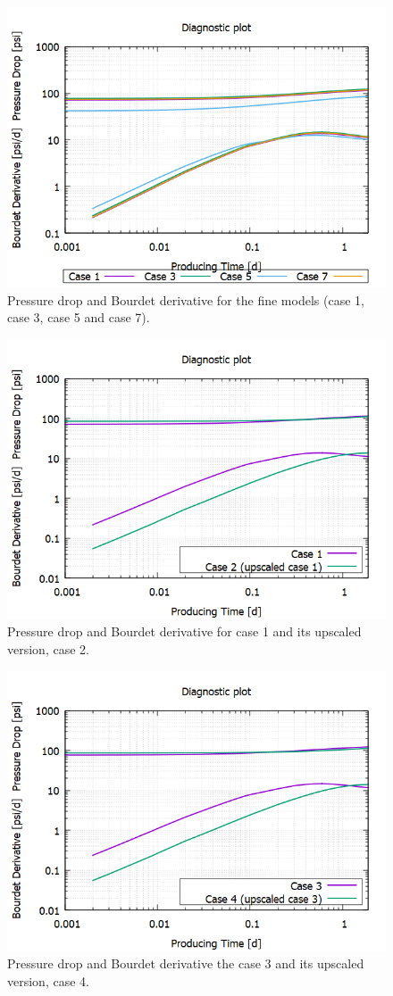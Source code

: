 \begin{figure}[H]
	\centering
	\includegraphics[width=0.8\linewidth]{Images/51}
	\caption{Pressure drop and Bourdet derivative for the fine models (case 1, case 3, case 5 and case 7).}
	\label{fig:51}
\end{figure}

\begin{figure}[H]
	\centering
	\includegraphics[width=0.8\linewidth]{Images/52}
	\caption{Pressure drop and Bourdet derivative for case 1 and its upscaled version, case 2.}
	\label{fig:52}
\end{figure}

\begin{figure}[H]
	\centering
	\includegraphics[width=0.8\linewidth]{Images/53}
	\caption{Pressure drop and Bourdet derivative the case 3 and its upscaled version, case 4.}
	\label{fig:53}
\end{figure}

